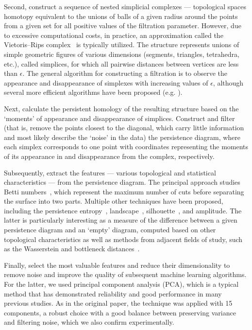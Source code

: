 \documentclass[pdflatex,sn-basic,Numbered]{sn-jnl}
\begin{document}
Second, construct a sequence of nested simplicial complexes --- topological spaces homotopy equivalent to the unions of balls of a given radius around the points from a given set for all positive values of the filtration parameter. However, due to excessive computational costs, in practice, an approximation called the Vietoris--Rips complex~\cite{Vietoris1927} is typically utilized. The structure represents unions of simple geometric figures of various dimensions (segments, triangles, tetrahedra, etc.), called simplices, for which all pairwise distances between vertices are less than $\epsilon$. The general algorithm for constructing a filtration is to observe the appearance and disappearance of simplexes with increasing values of $\epsilon$, although several more efficient algorithms have been proposed (e.g. \cite{Bauer_2021}).

Next, calculate the persistent homology of the resulting structure based on the `moments' of appearance and disappearance of simplices. Construct and filter (that is, remove the points closest to the diagonal, which carry little information and most likely describe the `noise' in the data) the persistence diagram, where each simplex corresponds to one point with coordinates representing the moments of its appearance in and disappearance from the complex, respectively.

Subsequently, extract the features --- various topological and statistical characteristics --- from the persistence diagram. The principal approach studies Betti numbers~\cite{Zomorodian2005}, which represent the maximum number of cuts before separating the surface into two parts. Multiple other techniques have been proposed, including the persistence entropy~\cite{10.1007/978-3-319-29228-1_11}, landscape~\cite{bubenik2015statisticaltopologicaldataanalysis}, silhouette~\cite{chazal2013stochasticconvergencepersistencelandscapes}, and amplitude. The latter is particularly interesting as a measure of the difference between a given persistence diagram and an `empty' diagram, computed based on other topological characteristics as well as methods from adjacent fields of study, such as the Wasserstein and bottleneck distances~\cite{Efrat2001}.

Finally, select the most valuable features and reduce their dimensionality to remove noise and improve the quality of subsequent machine learning algorithms. For the latter, we used principal component analysis (PCA), which is a typical method that has demonstrated reliability and good performance in many previous studies. As in the original paper, the technique was applied with 15 components, a robust choice with a good balance between preserving variance and filtering noise, which we also confirm experimentally.
\end{document}
